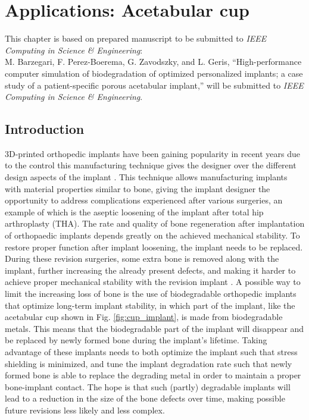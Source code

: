 \chapter{Applications: Acetabular cup}\label{ch:cup}

\begin{shaded}
This chapter is based on prepared manuscript to be submitted to  \textit{IEEE Computing in Science \& Engineering}:\\
M. Barzegari, F. Perez-Boerema, G. Zavodszky, and L. Geris, ``High-performance computer simulation of biodegradation of optimized personalized implants; a case study of a patient-specific porous acetabular implant,'' will be submitted to \textit{IEEE Computing in Science \& Engineering}.
\end{shaded}

\section{Introduction}


3D-printed orthopedic implants have been gaining  popularity in recent years due to the control this manufacturing technique gives the designer over the different design aspects of the implant \cite{Kumar2021,Yadav2020}. This technique allows manufacturing implants with material properties similar to bone, giving the implant designer the opportunity to address complications experienced after various surgeries, an example of which is the aseptic loosening of the implant after total hip arthroplasty (THA). The rate and quality of bone regeneration after implantation of orthopaedic implants depends greatly on the achieved mechanical stability. To restore proper function after implant loosening, the implant needs to be replaced. During these revision surgeries, some extra bone is removed along with the implant, further increasing the already present defects, and making it harder to achieve proper mechanical stability with the revision implant \cite{Luthringer2014}. A possible way to limit the increasing loss of bone is the use of biodegradable orthopedic implants that optimize long-term implant stability, in which part of the implant, like the acetabular cup shown in Fig. \ref{fig:cup_implant}, is made from biodegradable metals. This means that the biodegradable part of the implant will disappear and be replaced by newly formed bone during the implant's lifetime. Taking advantage of these implants needs to both optimize the implant such that stress shielding is minimized, and tune the implant degradation rate such that newly formed bone is able to replace the degrading metal in order to maintain a proper bone-implant contact. The hope is that such (partly) degradable implants will lead to a reduction in the size of the bone defects over time, making possible future revisions less likely and less complex.

